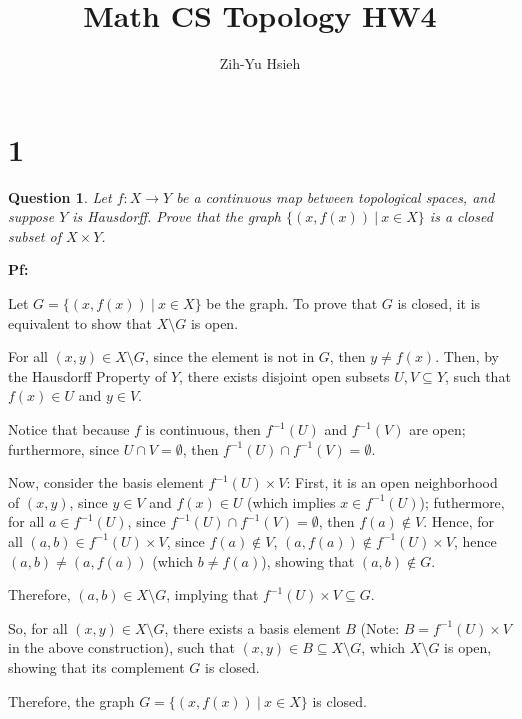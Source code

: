\documentclass{article}
\title{Math CS Topology HW4}
\author{Zih-Yu Hsieh}
\newtheorem{question}{Question}
\begin{document}
\maketitle

\section*{1}
\begin{myBox}[]{}
    \begin{question}
        Let $f:X\rightarrow Y$ be a continuous map between topological spaces, and suppose
        $Y$ is Hausdorff. Prove that the graph $\{(x,f(x))\ |\ x\in X\}$ is a closed subset of
        $X\times Y$.
    \end{question}
\end{myBox}

\textbf{Pf:}

Let $G=\{(x,f(x))\ |\ x\in X\}$ be the graph. To prove that $G$ is closed, it is equivalent to show that $X\setminus G$ is open.

For all $(x,y)\in X\setminus G$, since the element is not in $G$, then $y\neq f(x)$. Then, by the Hausdorff Property of $Y$, 
there exists disjoint open subsets $U,V\subseteq Y$, such that $f(x)\in U$ and $y\in V$.

\hfill

Notice that because $f$ is continuous, then $f^{-1}(U)$ and $f^{-1}(V)$ are open; furthermore, since $U\cap V=\emptyset$, 
then $f^{-1}(U)\cap f^{-1}(V)=\emptyset$.

Now, consider the basis element $f^{-1}(U)\times V$: First, it is an open neighborhood of $(x,y)$, since $y\in V$ and $f(x)\in U$ (which implies $x\in f^{-1}(U)$);
futhermore, for all $a\in f^{-1}(U)$, since $f^{-1}(U)\cap f^{-1}(V)=\emptyset$, then $f(a)\notin V$. 
Hence, for all $(a,b)\in f^{-1}(U)\times V$, since $f(a)\notin V$, $(a,f(a))\notin f^{-1}(U)\times V$, hence $(a,b)\neq (a,f(a))$ (which $b\neq f(a)$),
showing that $(a,b)\notin G$.

Therefore, $(a,b)\in X\setminus G$, implying that $f^{-1}(U)\times V\subseteq G$.

\hfill

So, for all $(x,y)\in X\setminus G$, there exists a basis element $B$ (Note: $B=f^{-1}(U)\times V$ in the above construction),
such that $(x,y)\in B\subseteq X\setminus G$, which $X\setminus G$ is open, showing that its complement $G$ is closed.

Therefore, the graph $G=\{(x,f(x))\ |\ x\in X\}$ is closed.
\end{document}
